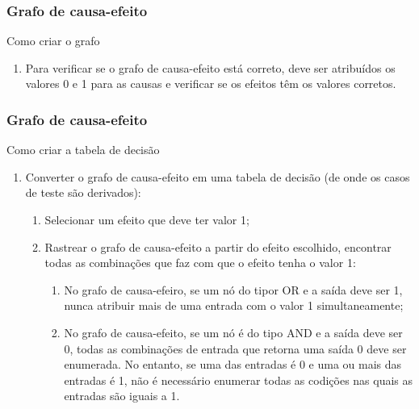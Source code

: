 \begin{frame}
\frametitle{Grafo de causa-efeito}
\label{procedure:cause-effect-graph}

\begin{block:procedure}{Como criar o grafo}
\begin{enumerate}
	\item Para verificar se o grafo de causa-efeito está correto, deve ser atribuídos
	os valores 0 e 1 para as causas e verificar se os efeitos têm os valores corretos.
\end{enumerate}
\end{block:procedure}


\hfill
{}
\end{frame}



\begin{frame}
\frametitle{Grafo de causa-efeito}

\begin{block:procedure}{Como criar a tabela de decisão}
\begin{enumerate}
	\item Converter o grafo de causa-efeito em uma tabela de decisão (de onde os casos de
	teste são derivados):
	\begin{enumerate}
		\item Selecionar um efeito que deve ter valor 1;

		\item Rastrear o grafo de causa-efeito a partir do efeito escolhido, encontrar
		todas as combinações que faz com que o efeito tenha o valor 1:
		\begin{enumerate}
				\item No grafo de causa-efeiro, se um nó do tipor OR
				e a saída deve ser 1, nunca atribuir mais de uma entrada com
				o valor 1 simultaneamente;

				\item No grafo de causa-efeito, se um nó é do tipo AND
				e a saída deve ser 0, todas as combinações de entrada que
				retorna uma saída 0 deve ser enumerada. No entanto, se uma das
				entradas é 0 e uma ou mais das entradas é 1,
				não é necessário enumerar todas as codições nas quais as entradas
				são iguais a 1.
		\end{enumerate}
	\end{enumerate}
\end{enumerate}
\end{block:procedure}
\end{frame}


